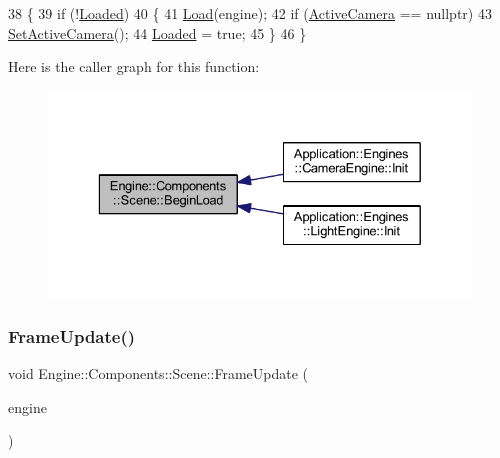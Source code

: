 \begin{DoxyCode}
38 \{
39     \textcolor{keywordflow}{if} (!\mbox{\hyperlink{classEngine_1_1Components_1_1Scene_ae828757eea5410550f6674421051a783}{Loaded}})
40     \{
41         \mbox{\hyperlink{classEngine_1_1Components_1_1Scene_a23c5b23e66646443670a487e7c016e73}{Load}}(engine);
42         \textcolor{keywordflow}{if} (\mbox{\hyperlink{classEngine_1_1Components_1_1Scene_a9408befee37d89e2c001d25b9e4ed75a}{ActiveCamera}} == \textcolor{keyword}{nullptr})
43             \mbox{\hyperlink{classEngine_1_1Components_1_1Scene_a936218df56c481f3aa12d684cee038f3}{SetActiveCamera}}();
44         \mbox{\hyperlink{classEngine_1_1Components_1_1Scene_ae828757eea5410550f6674421051a783}{Loaded}} = \textcolor{keyword}{true};
45     \}
46 \}
\end{DoxyCode}
Here is the caller graph for this function\+:
\nopagebreak
\begin{figure}[H]
\begin{center}
\leavevmode
\includegraphics[width=329pt]{classEngine_1_1Components_1_1Scene_af18bd334fe66952b8d79b8e9e99ab2d8_icgraph}
\end{center}
\end{figure}
\mbox{\label{classEngine_1_1Components_1_1Scene_abd8fcdcac52dbce6a0a18de3860ab087}} 
\subsubsection{\texorpdfstring{Frame\+Update()}{FrameUpdate()}}
{\footnotesize\ttfamily void Engine\+::\+Components\+::\+Scene\+::\+Frame\+Update (\begin{DoxyParamCaption}\item[{\mbox{\hyperlink{classEngine_1_1BaseEngine}{Base\+Engine}} $\ast$}]{engine }\end{DoxyParamCaption})\hspace{0.3cm}{\ttfamily [virtual]}}



